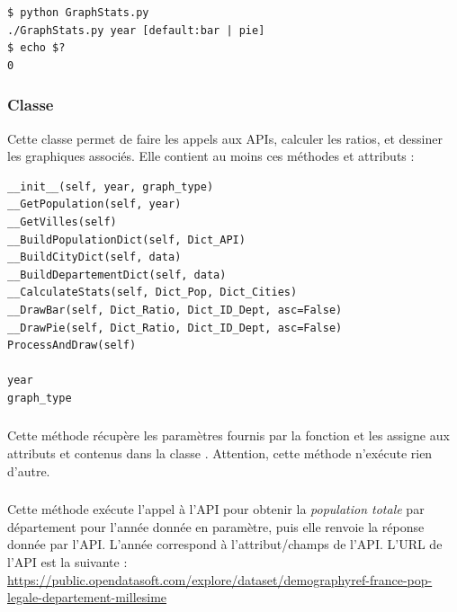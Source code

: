 \lstset{language=sh}
\begin{lstlisting}[frame=single]
$ python GraphStats.py
./GraphStats.py year [default:bar | pie]
$ echo $?
0
\end{lstlisting}


\clearpage

\subsubsection*{Classe }

\noindent Cette classe permet de faire les appels aux APIs, calculer les ratios, et dessiner les graphiques associés.
Elle contient au moins ces méthodes et attributs :

\bigskip

\lstset{language=python}
\begin{lstlisting}[frame=single]
__init__(self, year, graph_type)
__GetPopulation(self, year)
__GetVilles(self)
__BuildPopulationDict(self, Dict_API)
__BuildCityDict(self, data)
__BuildDepartementDict(self, data)
__CalculateStats(self, Dict_Pop, Dict_Cities)
__DrawBar(self, Dict_Ratio, Dict_ID_Dept, asc=False)
__DrawPie(self, Dict_Ratio, Dict_ID_Dept, asc=False)
ProcessAndDraw(self)

year
graph_type
\end{lstlisting}


\bigskip


\subsubsection*{}

\noindent Cette méthode récupère les paramètres fournis par la fonction  et les assigne aux attributs  et  contenus dans la classe .
Attention, cette méthode n'exécute rien d'autre.


\bigskip


\subsubsection*{}

\noindent Cette méthode exécute l'appel à l'API pour obtenir la \textit{population totale} par département pour l'année donnée en paramètre, puis elle renvoie la réponse donnée par l'API.
L'année correspond à l'attribut/champs  de l'API.
L'URL de l'API est la suivante : \url{https://public.opendatasoft.com/explore/dataset/demographyref-france-pop-legale-departement-millesime}

